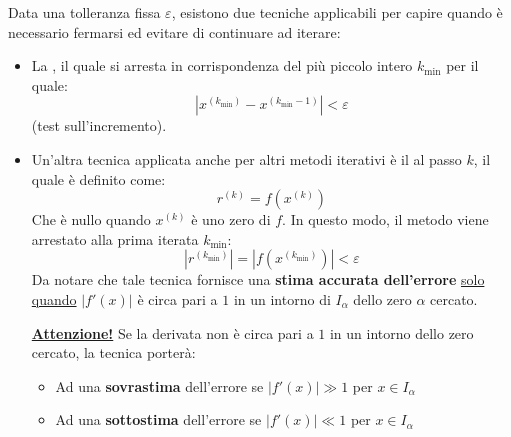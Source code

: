 Data una tolleranza fissa $\varepsilon$, esistono due tecniche applicabili per capire quando è necessario fermarsi ed evitare di continuare ad iterare:
\begin{itemize}
    \item La , il quale si arresta in corrispondenza del più piccolo intero $k_{\min}$ per il quale:
    \begin{equation}
        \left| x^{\left(k_{\min}\right)} - x^{\left(k_{\min} - 1\right)} \right| < \varepsilon
    \end{equation}
    (test sull'incremento).

    \item Un'altra tecnica applicata anche per altri metodi iterativi è il  al passo $k$, il quale è definito come:
    \begin{equation*}
        r^{(k)} = f\left(x^{(k)}\right)
    \end{equation*}
    Che è nullo quando $x^{(k)}$ è uno zero di $f$. In questo modo, il metodo viene arrestato alla prima iterata $k_{\min}$:
    \begin{equation}
        \left| r^{\left(k_{\min}\right)} \right| = \left| f\left(x^{\left(k_{\min}\right)}\right) \right| < \varepsilon
    \end{equation}
    Da notare che tale tecnica fornisce una \textbf{stima accurata dell'errore} \underline{solo quando} $\left| f'\left(x\right) \right|$ è circa pari a $1$ in un intorno di $I_{\alpha}$ dello zero $\alpha$ cercato.

    \underline{\textbf{Attenzione!}} Se la derivata non è circa pari a $1$ in un intorno dello zero cercato, la tecnica porterà:
    \begin{itemize}
        \item Ad una \textbf{sovrastima} dell'errore se $\left| f'\left(x\right) \right| \gg 1$ per $x \in I_{\alpha}$
        \item Ad una \textbf{sottostima} dell'errore se $\left| f'\left(x\right) \right| \ll 1$ per $x \in I_{\alpha}$
    \end{itemize}
\end{itemize}